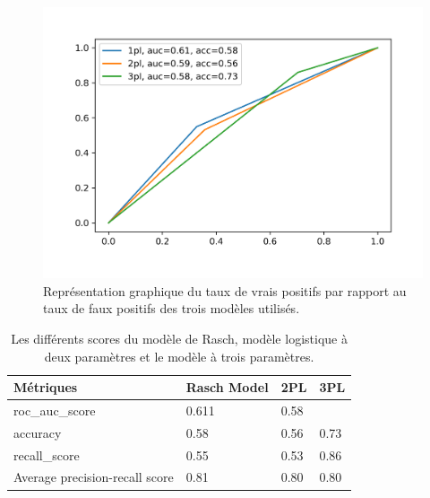 

\begin{figure}[H]
	\begin{center}
		\includegraphics[scale=0.8]{images/chapitre7/roc_auc.png}
	\end{center}
	\caption{Représentation graphique du taux de vrais positifs par rapport au taux de faux positifs des trois modèles utilisés.}
	\label{roc_auc}
\end{figure}

\begin{table}[H]
	\centering
	\begin{tabular}{|m{3cm}|m{3cm}|m{3cm}|m{3cm}|}
	\hline
	\rowcolor{blueforest}
	\color{white} \textbf{Métriques} & \color{white} \textbf{Rasch Model} & \color{white} \textbf{2PL} & \color{white} \textbf{3PL} \\
	\hline\hline
	roc\_auc\_score & 0.611 & 0.58 & \\ \hline
	accuracy & 0.58 & 0.56 & 0.73\\ \hline
	recall\_score & 0.55 & 0.53 & 0.86\\ \hline
	Average precision-recall score & 0.81 & 0.80 & 0.80\\ \hline
	\end{tabular}
	\caption{Les différents scores du modèle de Rasch, modèle logistique à deux paramètres et le modèle à trois paramètres.}
\end{table}

